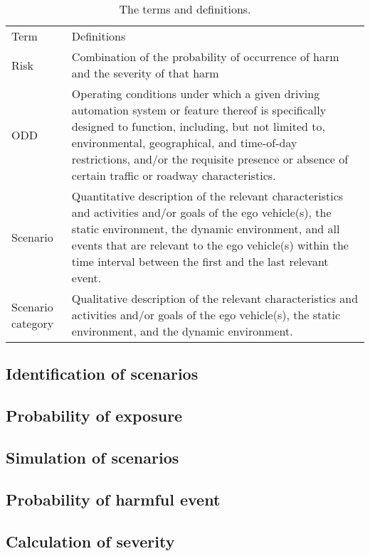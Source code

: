 \begin{table}
	\caption{The terms and definitions.}
	\label{tab:definitions}
	\begin{tabularx}{\linewidth}{TD}
		\toprule
		Term & Definitions \\ \otoprule
		Risk & Combination of the probability of occurrence of harm and the severity of that harm \autocite{ISO26262} \\
		ODD & Operating conditions under which a given driving automation system or feature thereof is specifically designed to function, including, but not limited to, environmental, geographical, and time-of-day restrictions, and/or the requisite presence or absence of certain traffic or roadway characteristics. \autocite{sae2021j3016} \\
		Scenario & Quantitative description of the relevant characteristics and activities and/or goals of the ego vehicle(s), the static environment, the dynamic environment, and all events that are relevant to the ego vehicle(s) within the time interval between the first and the last relevant event. \autocite{degelder2021ontology} \\
		Scenario category & Qualitative description of the relevant characteristics and activities and/or goals of the ego vehicle(s), the static environment, and the dynamic environment. \autocite{degelder2021ontology} \\
		\bottomrule
	\end{tabularx}
\end{table}



\subsection{Identification of scenarios}
\label{sec:scenario identification}





\subsection{Probability of exposure}
\label{sec:exposure}



\subsection{Simulation of scenarios}
\label{sec:simulation}



\subsection{Probability of harmful event}
\label{sec:harmful}



\subsection{Calculation of severity}
\label{sec:severity}
